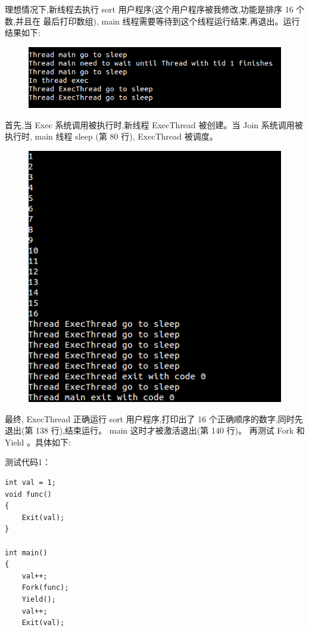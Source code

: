 \documentclass[nofonts]{ctexart}
\begin{document}
理想情况下,新线程去执行 sort 用户程序(这个用户程序被我修改,功能是排序 16 个数,并且在
最后打印数组), main 线程需要等待到这个线程运行结束,再退出。运行结果如下:
\begin{figure}[h!]
\includegraphics[width=5in]{e651.png}
\end{figure}

首先,当 Exec 系统调用被执行时,新线程 ExecThread 被创建。当 Join 系统调用被执行时,
main 线程 sleep (第 80 行), ExecThread 被调度。

\begin{figure}[h!]
\includegraphics[width=5in]{e652.png}
\end{figure}

最终, ExecThread 正确运行 sort 用户程序,打印出了 16 个正确顺序的数字,同时先退出(第
138 行),结束运行。 main 这时才被激活退出(第 140 行)。
再测试 Fork 和 Yield 。具体如下:

测试代码1：
\begin{lstlisting}
int val = 1;
void func()
{ 
	Exit(val);
}

int main() 
{
	val++;
	Fork(func);
	Yield();
	val++;
	Exit(val);
\end{lstlisting}
\end{document}
